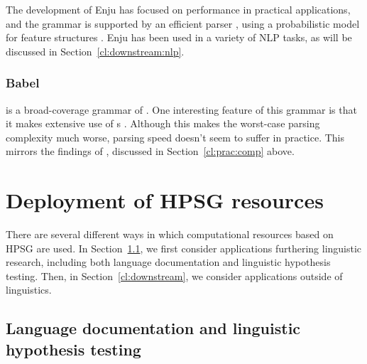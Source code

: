 \documentclass[output=paper
 	        ,biblatex
                ,babelshorthands
                ,newtxmath
                ,draftmode
                ,colorlinks, citecolor=brown
]{langscibook}
\begin{document}
The development of Enju has focused on performance in practical applications,
and the grammar is supported by an efficient parser \citep{tsuruoka2004enju,matsuzaki2007supertag},
using a probabilistic model for feature structures \citep{MT2008a-u}.
Enju has been used in a variety of NLP tasks, as will be discussed in Section~\ref{cl:downstream:nlp}.

\subsubsection{Babel}
\label{cl:other:babel}

 is a broad-coverage grammar of  \citep{Babel,Mueller99a}.
One interesting feature of this grammar is that
it makes extensive use of s \citep{Mueller2004b}.
Although this makes the worst-case parsing complexity much worse,
parsing speed doesn't seem to suffer in practice.
This mirrors the findings of \citet{Carroll94},
discussed in Section~\ref{cl:prac:comp} above.






\section{Deployment of HPSG resources}
\label{cl:deployment}

There are several different ways in which computational resources based on HPSG are used.  In
Section~\ref{cl:lang-doc}, we first consider applications furthering linguistic research, including
both language documentation and linguistic hypothesis testing.  Then, in
Section~\ref{cl:downstream}, we consider applications outside of linguistics.


\subsection{Language documentation and linguistic hypothesis testing}
\label{cl:lang-doc}
\end{document}
